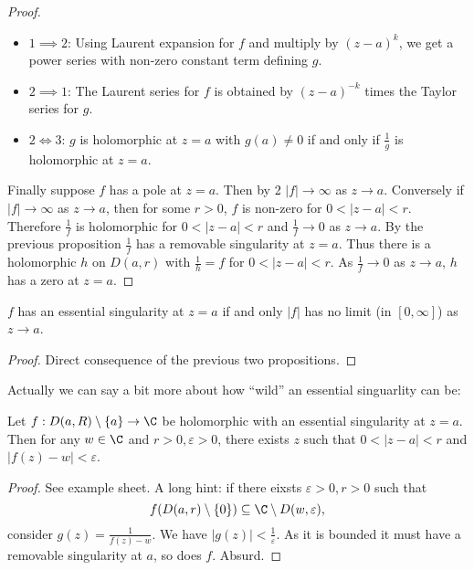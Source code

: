 \documentclass[a4paper]{article}
\begin{document}
\begin{proof}\leavevmode
  \begin{itemize}
  \item \(1 \implies 2\): Using Laurent expansion for \(f\) and multiply by \((z - a)^k\), we get a power series with non-zero constant term defining \(g\).
  \item \(2 \implies 1\): The Laurent series for \(f\) is obtained by \((z - a)^{-k}\) times the Taylor series for \(g\).
  \item \(2 \Longleftrightarrow 3\): \(g\) is holomorphic at \(z = a\) with \(g(a) \neq 0\) if and only if \(\frac{1}{g}\) is holomorphic at \(z = a\).
  \end{itemize}

  Finally suppose \(f\) has a pole at \(z = a\). Then by 2 \(|f| \to \infty\) as \(z \to a\). Conversely if \(|f| \to \infty\) as \(z \to a\), then for some \(r > 0\), \(f\) is non-zero for \(0 < |z - a| < r\). Therefore \(\frac{1}{f}\) is holomorphic for \(0 < |z - a| < r\) and \(\frac{1}{f} \to 0\) as \(z \to a\). By the previous proposition \(\frac{1}{f}\) has a removable singularity at \(z = a\). Thus there is a holomorphic \(h\) on \(D(a, r)\) with \(\frac{1}{h} = f\) for \(0 < |z - a| < r\). As \(\frac{1}{f} \to 0\) as \(z \to a\), \(h\) has a zero at \(z = a\).
\end{proof}

\begin{corollary}
  \(f\) has an essential singularity at \(z = a\) if and only \(|f|\) has no limit (in \([0, \infty]\)) as \(z \to a\).
\end{corollary}

\begin{proof}
  Direct consequence of the previous two propositions.
\end{proof}

Actually we can say a bit more about how ``wild'' an essential singuarlity can be:

\begin{theorem}
  Let \(f: D(a, R) \setminus \{a\} \to \C\) be holomorphic with an essential singularity at \(z = a\). Then for any \(w \in \C\) and \(r > 0, \varepsilon > 0\), there exists \(z\) such that \(0 < |z - a| < r\) and \(|f(z) - w| < \varepsilon\).
\end{theorem}

\begin{proof}
  See example sheet. A long hint: if there eixsts \(\varepsilon > 0, r > 0\) such that
  \[
    f(D(a, r) \setminus \{0\}) \subseteq \C \setminus D(w, \varepsilon),
  \]
  consider \(g(z) = \frac{1}{f(z) - w}\). We have \(|g(z)| < \frac{1}{\varepsilon}\). As it is bounded it must have a removable singularity at \(a\), so does \(f\). Absurd.
\end{proof}
\end{document}
